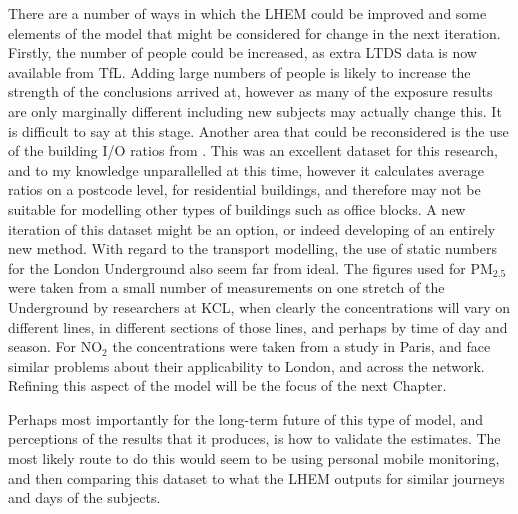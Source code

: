 There are a number of ways in which the LHEM could be improved and some elements of the model that might be considered for change in the next iteration.
Firstly, the number of people could be increased, as extra LTDS data is now available from TfL. Adding large numbers of people is likely to increase the strength of the conclusions arrived at, however as many of the exposure results are only marginally different including new subjects may actually change this. It is difficult to say at this stage.
Another area that could be reconsidered is the use of the building I/O ratios from \cite{Taylor2014}. This was an excellent dataset for this research, and to my knowledge unparallelled at this time, however it calculates average ratios on a postcode level, for residential buildings, and therefore may not be suitable for modelling other types of buildings such as office blocks. A new iteration of this dataset might be an option, or indeed developing of an entirely new method.
With regard to the transport modelling, the use of static numbers for the London Underground also seem far from ideal. The figures used for PM$_{2.5}$ were taken from a small number of measurements on one stretch of the Underground by researchers at KCL, when clearly the concentrations will vary on different lines, in different sections of those lines, and perhaps by time of day and season. For NO$_{2}$ the concentrations were taken from a study in Paris, and face similar problems about their applicability to London, and across the network. Refining this aspect of the model will be the focus of the next Chapter.

Perhaps most importantly for the long-term future of this type of model, and perceptions of the results that it produces, is how to validate the estimates. The most likely route to do this would seem to be using personal mobile monitoring, and then comparing this dataset to what the LHEM outputs for similar journeys and days of the subjects.




